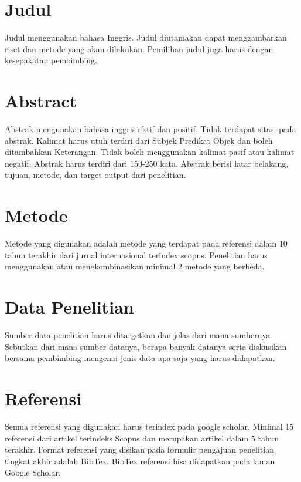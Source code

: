 \section{Judul}
Judul menggunakan bahasa Inggris. Judul diutamakan dapat menggambarkan riset dan metode yang akan dilakukan. Pemilihan judul juga harus dengan kesepakatan pembimbing. 

\section{Abstract}
Abstrak mengunakan bahasa inggris aktif dan positif. Tidak terdapat sitasi pada abstrak. Kalimat harus utuh terdiri dari Subjek Predikat Objek dan boleh ditambahkan Keterangan. Tidak boleh menggunakan kalimat pasif atau kalimat negatif. Abstrak harus terdiri dari 150-250 kata. Abstrak berisi latar belakang, tujuan, metode, dan target output dari penelitian.

\section{Metode}
Metode yang digunakan adalah metode yang terdapat pada referensi dalam 10 tahun terakhir dari jurnal internasional terindex scopus. Penelitian harus menggunakan atau mengkombinasikan minimal 2 metode yang berbeda.

\section{Data Penelitian}
Sumber data penelitian harus ditargetkan dan jelas dari mana sumbernya. Sebutkan dari mana sumber datanya, berapa banyak datanya serta diskusikan bersama pembimbing mengenai jenis data apa saja yang harus didapatkan. 

\section{Referensi}
Semua referensi yang digunakan harus terindex pada google scholar. Minimal 15 referensi dari artikel terindeks Scopus dan merupakan artikel dalam 5 tahun terakhir. Format referensi yang disikan pada formulir pengajuan penelitian tingkat akhir adalah BibTex. BibTex referensi bisa didapatkan pada laman Google Scholar.
